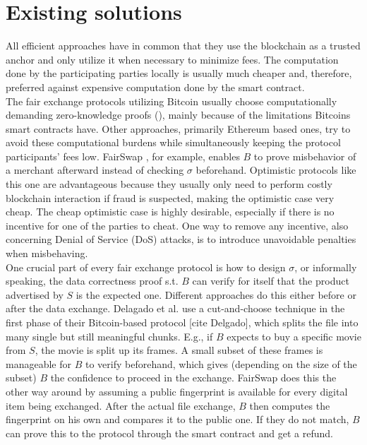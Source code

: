 \documentclass{cacthesis}
\newcounter{protocol}
\begin{document}
        \section{Existing solutions}
        All efficient approaches have in common that they use the blockchain as a trusted anchor and only utilize it when necessary to minimize fees. The computation done by the participating parties locally is usually much cheaper and, therefore, preferred against expensive computation done by the smart contract. \\
        The fair exchange protocols utilizing Bitcoin usually choose computationally demanding zero-knowledge proofs (\cite{zkcp}\cite{DELGADOSEGURA2020832}), mainly because of the limitations Bitcoins smart contracts have. Other approaches, primarily Ethereum based ones, try to avoid these computational burdens while simultaneously keeping the protocol participants' fees low. FairSwap \cite{10.1145/3243734.3243857}, for example, enables $B$ to prove misbehavior of a merchant afterward instead of checking $\sigma$ beforehand. Optimistic protocols like this one are advantageous because they usually only need to perform costly blockchain interaction if fraud is suspected, making the optimistic case very cheap. The cheap optimistic case is highly desirable, especially if there is no incentive for one of the parties to cheat. One way to remove any incentive, also concerning Denial of Service (DoS) attacks, is to introduce unavoidable penalties when misbehaving. \\
        One crucial part of every fair exchange protocol is how to design $\sigma$, or informally speaking, the data correctness proof s.t. $B$ can verify for itself that the product advertised by $S$ is the expected one. Different approaches do this either before or after the data exchange. Delagado et al. use a cut-and-choose technique in the first phase of their Bitcoin-based protocol [cite Delgado], which splits the file into many single but still meaningful chunks. E.g., if $B$ expects to buy a specific movie from $S$, the movie is split up its frames. A small subset of these frames is manageable for $B$ to verify beforehand, which gives (depending on the size of the subset) $B$ the confidence to proceed in the exchange. FairSwap does this the other way around by assuming a public fingerprint is available for every digital item being exchanged. After the actual file exchange, $B$ then computes the fingerprint on his own and compares it to the public one. If they do not match, $B$ can prove this to the protocol through the smart contract and get a refund.
        
\end{document}
